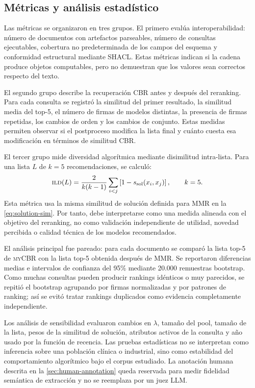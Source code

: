 \documentclass[11pt,a4paper]{article}
\newcommand{\myCBR}{\textsc{myCBR}}
\newcommand{\ILD}{\textsc{ild}}
\begin{document}
\subsection{Métricas y análisis estadístico}

Las métricas se organizaron en tres grupos. El primero evalúa interoperabilidad: número de documentos con artefactos parseables, número de consultas ejecutables, cobertura no predeterminada de los campos del esquema y conformidad estructural mediante SHACL. Estas métricas indican si la cadena produce objetos computables, pero no demuestran que los valores sean correctos respecto del texto.

El segundo grupo describe la recuperación CBR antes y después del reranking. Para cada consulta se registró la similitud del primer resultado, la similitud media del top-5, el número de firmas de modelos distintas, la presencia de firmas repetidas, los cambios de orden y los cambios de conjunto. Estas medidas permiten observar si el postproceso modifica la lista final y cuánto cuesta esa modificación en términos de similitud CBR.

El tercer grupo mide diversidad algorítmica mediante disimilitud intra-lista. Para una lista $L$ de $k=5$ recomendaciones, se calculó:
\begin{equation}
 \ILD(L)=\frac{2}{k(k-1)}\sum_{i<j}\left[1-s_{\mathrm{sol}}(x_i,x_j)\right],\qquad k=5.
 \label{eq:ild}
\end{equation}
Esta métrica usa la misma similitud de solución definida para MMR en la \cref{eq:solution-sim}. Por tanto, debe interpretarse como una medida alineada con el objetivo del reranking, no como validación independiente de utilidad, novedad percibida o calidad técnica de los modelos recomendados.

El análisis principal fue pareado: para cada documento se comparó la lista top-5 de \myCBR{} con la lista top-5 obtenida después de MMR. Se reportaron diferencias medias e intervalos de confianza del 95\% mediante 20.000 remuestras bootstrap. Como muchas consultas pueden producir rankings idénticos o muy parecidos, se repitió el bootstrap agrupando por firmas normalizadas y por patrones de ranking; así se evitó tratar rankings duplicados como evidencia completamente independiente.

Los análisis de sensibilidad evaluaron cambios en $\lambda$, tamaño del pool, tamaño de la lista, pesos de la similitud de solución, atributos activos de la consulta y año usado por la función de recencia. Las pruebas estadísticas no se interpretan como inferencia sobre una población clínica o industrial, sino como estabilidad del comportamiento algorítmico bajo el corpus estudiado. La anotación humana descrita en la \cref{sec:human-annotation} queda reservada para medir fidelidad semántica de extracción y no se reemplaza por un juez LLM.

\FloatBarrier


\end{document}
